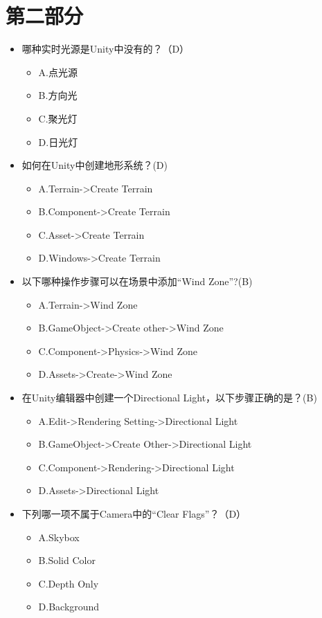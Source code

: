 \documentclass[9pt, b5paper]{article}
\begin{document}
\section{第二部分}
\label{sec:org01e7247}
\begin{itemize}
\item 哪种实时光源是Unity中没有的？（D）
\begin{itemize}
\item A.点光源
\item B.方向光
\item C.聚光灯
\item D.日光灯
\end{itemize}
\item 如何在Unity中创建地形系统？(D)
\begin{itemize}
\item A.Terrain->Create Terrain
\item B.Component->Create Terrain
\item C.Asset->Create Terrain
\item D.Windows->Create Terrain
\end{itemize}
\item 以下哪种操作步骤可以在场景中添加“Wind Zone”?(B)
\begin{itemize}
\item A.Terrain->Wind Zone
\item B.GameObject->Create other->Wind Zone
\item C.Component->Physics->Wind Zone
\item D.Assets->Create->Wind Zone
\end{itemize}
\item 在Unity编辑器中创建一个Directional Light，以下步骤正确的是？(B)
\begin{itemize}
\item A.Edit->Rendering Setting->Directional Light
\item B.GameObject->Create Other->Directional Light
\item C.Component->Rendering->Directional Light
\item D.Assets->Directional Light
\end{itemize}
\item 下列哪一项不属于Camera中的“Clear Flags”？（D）
\begin{itemize}
\item A.Skybox
\item B.Solid Color
\item C.Depth Only
\item D.Background
\end{itemize}

\end{itemize}
\end{document}
